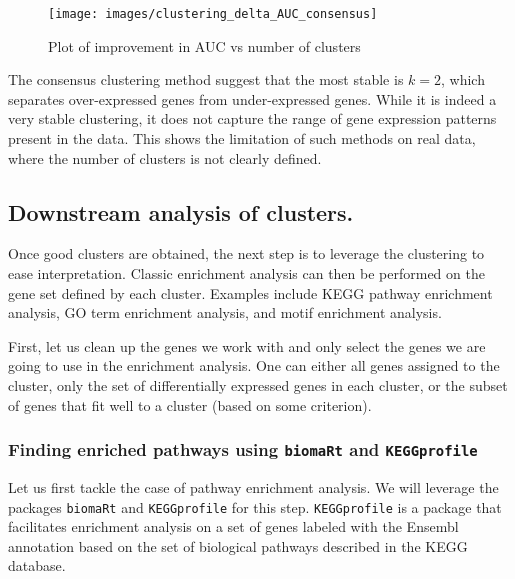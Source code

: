 \documentclass[9pt,a4paper,]{extarticle}
\begin{document}
\begin{figure}[H]

{\centering \texttt{[image: images/clustering\_delta\_AUC\_consensus]} 

}

\caption{Plot of improvement in AUC vs number of clusters}\label{fig:plotDeltaAUC}
\end{figure}

The consensus clustering method suggest that the most stable is \(k=2\), which
separates over-expressed genes from under-expressed genes. While it is indeed
a very stable clustering, it does not capture the range of gene expression
patterns present in the data. This shows the limitation of such methods on real
data, where the number of clusters is not clearly defined.

\hypertarget{downstream-analysis-of-clusters.}{%
\subsection{Downstream analysis of clusters.}\label{downstream-analysis-of-clusters.}}

Once good clusters are obtained, the next step is to leverage the clustering
to ease interpretation. Classic enrichment analysis can then be performed
on the gene set defined by each cluster. Examples include KEGG pathway enrichment analysis,
GO term enrichment analysis, and motif enrichment analysis.

First, let us clean up the genes we work with and only select the genes we are
going to use in the enrichment analysis. One can either all genes assigned to
the cluster, only the set of differentially expressed genes in each cluster,
or the subset of genes that fit well to a cluster (based on some criterion).

\hypertarget{finding-enriched-pathways-using-biomart-and-keggprofile}{%
\subsubsection{\texorpdfstring{Finding enriched pathways using \texttt{biomaRt} and \texttt{KEGGprofile}}{Finding enriched pathways using biomaRt and KEGGprofile}}\label{finding-enriched-pathways-using-biomart-and-keggprofile}}

Let us first tackle the case of pathway enrichment analysis. We will leverage
the packages \texttt{biomaRt} \citep{durinck:biomart} and \texttt{KEGGprofile}
\citep{zhao:keggprofile} for this step. \texttt{KEGGprofile} is a package that facilitates
enrichment analysis on a set of genes labeled with the Ensembl annotation
\citep{ensembl2020} based on the set of biological pathways described in the KEGG
database\citep{KEGG}.
\end{document}
